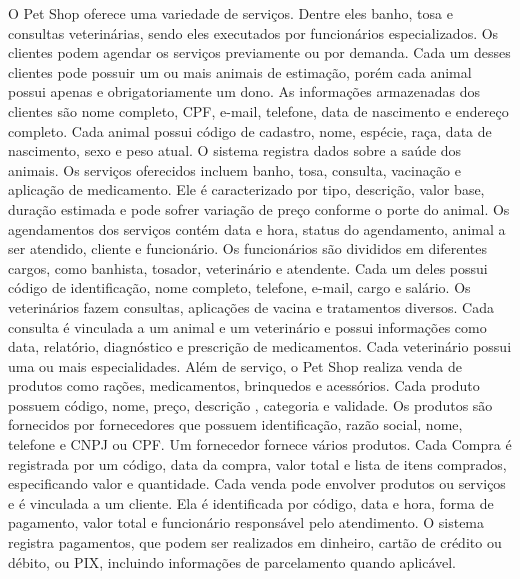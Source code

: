 \documentclass{article}
\begin{document}
O Pet Shop oferece uma variedade de serviços. Dentre eles banho, tosa e consultas veterinárias, sendo eles executados por funcionários especializados. Os clientes podem agendar os serviços previamente ou por demanda. Cada um desses clientes pode possuir um ou mais animais de estimação, porém cada animal possui apenas e obrigatoriamente um dono. As informações armazenadas dos clientes são nome completo, CPF, e-mail, telefone, data de nascimento e endereço completo. Cada animal possui código de cadastro, nome, espécie, raça, data de nascimento, sexo e peso atual. O sistema registra dados sobre a saúde dos animais. Os serviços oferecidos incluem banho, tosa, consulta, vacinação e aplicação de medicamento. Ele é caracterizado por tipo, descrição, valor base, duração estimada e pode sofrer variação de preço conforme o porte do animal. Os agendamentos dos serviços contém data e hora, status do agendamento, animal a ser atendido, cliente e funcionário. Os funcionários são divididos em diferentes cargos, como banhista, tosador, veterinário e atendente. Cada um deles possui código de identificação, nome completo, telefone, e-mail, cargo e salário. Os veterinários fazem consultas, aplicações de vacina e tratamentos diversos. Cada consulta é vinculada a um animal e um veterinário e possui informações como data, relatório, diagnóstico e prescrição de medicamentos. Cada veterinário possui uma ou mais especialidades. Além de serviço, o Pet Shop realiza venda de produtos como rações, medicamentos, brinquedos e acessórios. Cada produto possuem código, nome, preço, descrição , categoria e validade. Os produtos são fornecidos por fornecedores que possuem identificação, razão social, nome, telefone e CNPJ ou CPF. Um fornecedor fornece vários produtos. Cada Compra é registrada por um código, data da compra, valor total e lista de itens comprados, especificando valor e quantidade.  Cada venda pode envolver produtos ou serviços e é vinculada a um cliente. Ela é identificada por código, data e hora, forma de pagamento, valor total e funcionário responsável pelo atendimento. O sistema registra pagamentos, que podem ser realizados em dinheiro, cartão de crédito ou débito, ou PIX, incluindo informações de parcelamento quando aplicável.

\newpage
\end{document}
